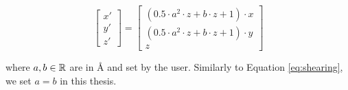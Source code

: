 \begin{equation}
  \label{eq:tapering}
  \begin{bmatrix}
    x' \\
    y' \\
    z'
  \end{bmatrix} =
  \begin{bmatrix}
    (0.5\cdot a^2\cdot z + b\cdot z + 1) \cdot x\\
    (0.5\cdot a^2\cdot z + b\cdot z + 1) \cdot y\\
    z
  \end{bmatrix}
\end{equation}

where $a, b\in\mathbb{R}$ are in \si{\angstrom} and set by the user. Similarly to
Equation \ref{eq:shearing}, we set $a=b$ in this thesis.

